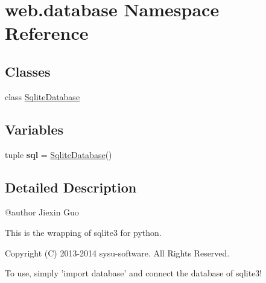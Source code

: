 \hypertarget{namespaceweb_1_1database}{\section{web.\-database Namespace Reference}
\label{namespaceweb_1_1database}
}
\subsection*{Classes}
\begin{DoxyCompactItemize}
\item 
class \hyperlink{classweb_1_1database_1_1_sqlite_database}{Sqlite\-Database}
\end{DoxyCompactItemize}
\subsection*{Variables}
\begin{DoxyCompactItemize}
\item 
\hypertarget{namespaceweb_1_1database_a8ee68d73d9fa5cb7d602355fb7ce0b92}{tuple {\bfseries sql} = \hyperlink{classweb_1_1database_1_1_sqlite_database}{Sqlite\-Database}()}\label{namespaceweb_1_1database_a8ee68d73d9fa5cb7d602355fb7ce0b92}

\end{DoxyCompactItemize}


\subsection{Detailed Description}
\begin{DoxyVerb}@author Jiexin Guo

This is the wrapping of sqlite3 for python.

Copyright (C) 2013-2014 sysu-software. All Rights Reserved.

To use, simply 'import database' and connect the database of sqlite3!\end{DoxyVerb}
 
